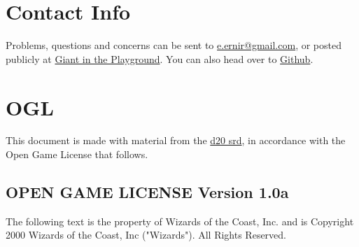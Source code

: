 \section{Contact Info}
Problems, questions and concerns can be sent to
\href{mailto:e.ernir@gmail.com}{e.ernir@gmail.com}, or posted publicly at \href{http://www.giantitp.com/forums/showthread.php?t=194002}{Giant in the Playground}. You can also head over to \href{https://github.com/Ernir/VancianToPsionics}{Github}.
\section{OGL}
This document is made with material from the \href{http://www.wizards.com/default.asp?x=d20/article/srd35}{d20 srd},
in accordance with the Open Game License that follows.
\subsection{OPEN GAME LICENSE Version 1.0a}
\label{sec:OGL}
\small
The following text is the property of Wizards of the Coast, Inc. and is Copyright 2000 Wizards of the Coast, Inc ("Wizards"). All Rights Reserved.

